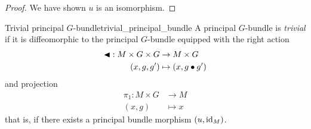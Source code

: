 \begin{proof}
    We have shown \(u\) is an isomorphism. %
\end{proof}

\begin{definition}{Trivial principal \(G\)-bundle}{trivial_principal_bundle}
    A principal \(G\)-bundle  is \emph{trivial} if it is diffeomorphic to the principal \(G\)-bundle  equipped with the right action
    \begin{align*}
        \mathbin{\blacktriangleleft} : M \times G \times G &\to M \times G\\
                             (x,g,g') &\mapsto (x, g\bullet g')
    \end{align*}
    and projection
    \begin{align*}
        \pi_1 : M \times G &\to M\\
                     (x,g) &\mapsto x
    \end{align*}
    that is, if there exists a principal bundle morphism \((u,\operatorname{id}_{M})\).
\end{definition}

